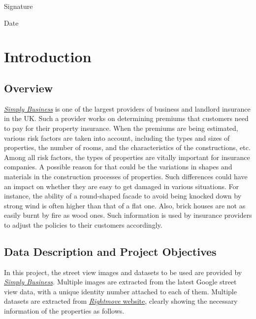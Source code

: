 \documentclass[11pt,twoside]{article}
\numberwithin{Theorem}{section}
\numberwithin{Definition}{section}
\numberwithin{Lemma}{section}
\numberwithin{Algorithm}{section}
\numberwithin{equation}{section}
\newcommand{\dottedline}[1]{\makebox[#1]{.\dotfill}}
\begin{document}
Signature \dottedline{8cm}

\vspace{5mm}

Date \dottedline{8cm}


\clearpage



\pagestyle{plain}
\setcounter{page}{1}

\tableofcontents
\clearpage
\listoftables
\listoffigures
\cleardoublepage

\setcounter{page}{1}

\nocite{*}

\clearpage

\section{Introduction}
\label{sec:intro}
\subsection{Overview}
\href{https://www.simplybusiness.co.uk/}{\textit{Simply Business}} is one of the largest providers of business and landlord insurance in the UK. Such a provider works on determining premiums that customers need to pay for their property insurance. When the premiums are being estimated, various risk factors are taken into account, including the types and sizes of properties, the number of rooms, and the characteristics of the constructions, etc. Among all risk factors, the types of properties are vitally important for insurance companies. A possible reason for that could be the variations in shapes and materials in the construction processes of properties. Such differences could have an impact on whether they are easy to get damaged in various situations. For instance, the ability of a round-shaped facade to avoid being knocked down by strong wind is often higher than that of a flat one. Also, brick houses are not as easily burnt by fire as wood ones. Such information is used by insurance providers to adjust the policies to their customers accordingly.

\subsection{Data Description and Project Objectives}
In this project, the street view images and datasets to be used are provided by \href{https://www.simplybusiness.co.uk/}{\textit{Simply Business}}. Multiple images are extracted from the latest Google street view data, with a unique identity number attached to each of them. Multiple datasets are extracted from \href{https://www.rightmove.co.uk/}{\textit{Rightmove} website}, clearly showing the necessary information of the properties as follows.
\end{document}
